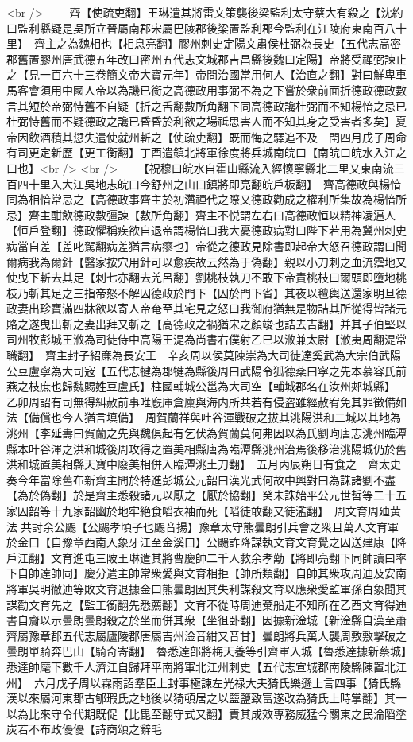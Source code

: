 <br />
　　齊【使疏吏翻】王琳遣其將雷文策襲後梁監利太守蔡大有殺之【沈約曰監利縣疑是吳所立晉屬南郡宋屬巴陵郡後梁置監利郡今監利在江陵府東南百八十里】　齊主之為魏相也【相息亮翻】膠州刺史定陽文肅侯杜弼為長史【五代志高密郡舊置膠州唐武德五年改曰密州五代志文城郡吉昌縣後魏曰定陽】帝將受禪弼諫止之【見一百六十三卷簡文帝大寶元年】帝問治國當用何人【治直之翻】對曰鮮卑車馬客會須用中國人帝以為譏已銜之高德政用事弼不為之下嘗於衆前面折德政德政數言其短於帝弼恃舊不自疑【折之舌翻數所角翻下同高德政讒杜弼而不知楊愔之忌已杜弼恃舊而不疑德政之讒已昏昏於利欲之場祗思害人而不知其身之受害者多矣】夏帝因飲酒積其愆失遣使就州斬之【使疏吏翻】既而悔之驛追不及　閏四月戊子周命有司更定新歷【更工衡翻】丁酉遣鎮北將軍徐度將兵城南皖口【南皖口皖水入江之口也】<br />
<br />
　　【祝穆曰皖水自霍山縣流入經懷寧縣北二里又東南流三百四十里入大江吳地志皖口今舒州之山口鎮將即亮翻皖戶板翻】　齊高德政與楊愔同為相愔常忌之【高德政事齊主於初濳禪代之際又德政勸成之權利所集故為楊愔所忌】齊主酣飲德政數彊諫【數所角翻】齊主不悦謂左右曰高德政恒以精神凌逼人【恒戶登翻】德政懼稱疾欲自退帝謂楊愔曰我大憂德政病對曰陛下若用為冀州刺史病當自差【差叱駕翻病差猶言病瘳也】帝從之德政見除書即起帝大怒召德政謂曰聞爾病我為爾針【醫家按穴用針可以愈疾故云然為于偽翻】親以小刀刺之血流霑地又使曳下斬去其足【刺七亦翻去羌呂翻】劉桃枝執刀不敢下帝責桃枝曰爾頭即墮地桃枝乃斬其足之三指帝怒不解囚德政於門下【囚於門下省】其夜以氊輿送還家明旦德政妻出珍寶滿四牀欲以寄人帝奄至其宅見之怒曰我御府猶無是物詰其所從得皆諸元賂之遂曳出斬之妻出拜又斬之【高德政之禍猶宋之顏竣也詰去吉翻】并其子伯堅以司州牧彭城王浟為司徒侍中高陽王湜為尚書右僕射乙巳以浟兼太尉【浟夷周翻湜常職翻】　齊主封子紹亷為長安王　辛亥周以侯莫陳崇為大司徒達奚武為大宗伯武陽公豆盧寧為大司宼【五代志犍為郡犍為縣後周曰武陽令狐德棻曰寜之先本慕容氏前燕之枝庶也歸魏賜姓豆盧氏】柱國輔城公邕為大司空【輔城郡名在汝州郟城縣】　乙卯周詔有司無得糾赦前事唯廐庫倉廩與海内所共若有侵盗雖經赦宥免其罪徵備如法【備償也今人猶言填備】　周賀蘭祥與吐谷渾戰破之拔其洮陽洪和二城以其地為洮州【李延夀曰賀蘭之先與魏俱起有乞伏為賀蘭莫何弗因以為氏劉昫唐志洮州臨潭縣本叶谷渾之洪和城後周攻得之置美相縣唐為臨潭縣洮州治焉後移治洮陽城仍於舊洪和城置美相縣天寶中廢美相併入臨潭洮土刀翻】　五月丙辰朔日有食之　齊太史奏今年當除舊布新齊主問於特進彭城公元韶曰漢光武何故中興對曰為誅諸劉不盡【為於偽翻】於是齊主悉殺諸元以厭之【厭於協翻】癸未誅始平公元世哲等二十五家囚韶等十九家韶幽於地牢絶食㗖衣袖而死【㗖徒敢翻又徒濫翻】　周文育周廸黄法共討余公颺【公颺孝頃子也颺音揚】豫章太守熊曇朗引兵會之衆且萬人文育軍於金口【自豫章西南入象牙江至金溪口】公颺詐降謀執文育文育覺之囚送建康【降戶江翻】文育進屯三陂王琳遣其將曹慶帥二千人救余孝勱【將即亮翻下同帥讀曰率下自帥達帥同】慶分遣主帥常衆愛與文育相拒【帥所類翻】自帥其衆攻周迪及安南將軍吳明徹迪等敗文育退據金口熊曇朗因其失利謀殺文育以應衆愛監軍孫白象聞其謀勸文育先之【監工銜翻先悉薦翻】文育不從時周迪棄船走不知所在乙酉文育得迪書自齎以示曇朗曇朗殺之於坐而併其衆【坐徂卧翻】因據新淦城【新淦縣自漢至蕭齊屬豫章郡五代志屬廬陵郡唐屬吉州淦音紺又音甘】曇朗將兵萬人襲周敷敷擊破之曇朗單騎奔巴山【騎奇寄翻】　魯悉達部將梅天養等引齊軍入城【魯悉達據新蔡城】悉達帥麾下數千人濟江自歸拜平南將軍北江州刺史【五代志宣城郡南陵縣陳置北江州】　六月戊子周以霖雨詔羣臣上封事極諫左光禄大夫猗氏樂遜上言四事【猗氏縣漢以來屬河東郡古郇瑕氏之地後以猗頓居之以盬鹽致富遂改為猗氏上時掌翻】其一以為比來守令代期既促【比毘至翻守式又翻】責其成效專務威猛今關東之民淪䧟塗炭若不布政優優【詩商頌之辭毛